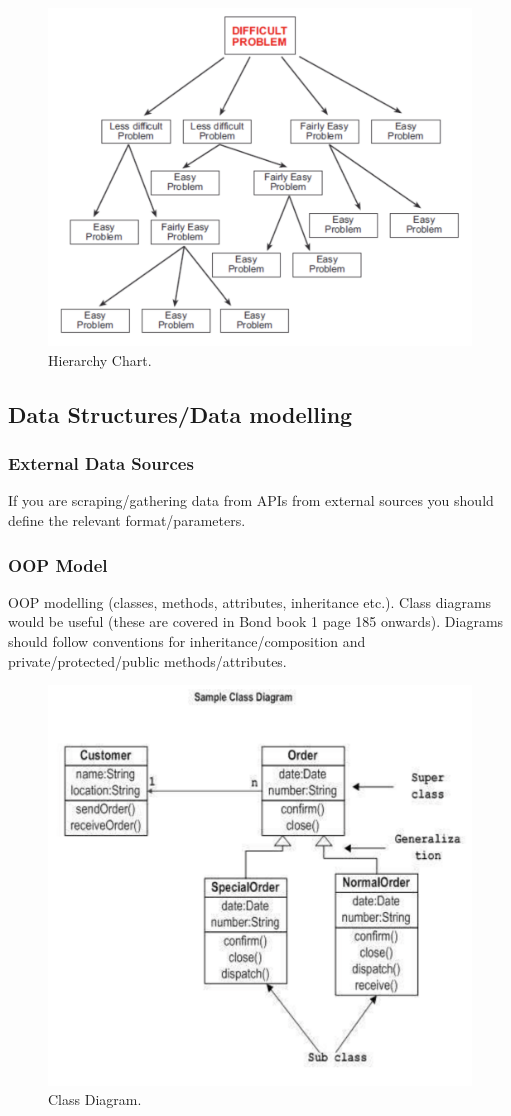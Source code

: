 \documentclass[10pt]{article}
\begin{document}
\begin{figure}[!ht]
    \centering
    \includegraphics[width = 0.5\linewidth]{hierarchy_chart.png}
    \caption{Hierarchy Chart.}
    \label{fig:hierarchy}
\end{figure}

\subsection{Data Structures/Data modelling}
\subsubsection{External Data Sources}
If you are scraping/gathering data from APIs from external sources you should define the relevant format/parameters.

\subsubsection{OOP Model}
OOP modelling (classes, methods, attributes, inheritance etc.). Class diagrams would be useful (these are covered in Bond book 1 page 185 onwards). Diagrams should follow conventions for inheritance/composition and private/protected/public methods/attributes.

\begin{figure}[!ht]
    \centering
    \includegraphics[width = 0.5\linewidth]{class_diagram.png}
    \caption{Class Diagram.}
    \label{fig:classes}
\end{figure}
\end{document}
